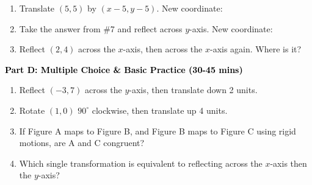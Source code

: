 \documentclass[12pt, letterpaper, fleqn]{article}
\newcommand{\blank}{\underline{\hspace{2.2cm}}}
\begin{document}
\vspace{3mm}

\begin{enumerate}[itemsep=2.5cm, leftmargin=0.6cm, resume]
\item Translate $(5, 5)$ by $(x-5, y-5)$. New coordinate: \blank
\item Take the answer from \#7 and reflect across $y$-axis. New coordinate: \blank
\item Reflect $(2, 4)$ across the $x$-axis, then across the $x$-axis again. Where is it? \blank
\end{enumerate}

\newpage

\begin{tcolorbox}[colback=customteal!20]
\large\textcolor{black}{\textbf{Part D: Multiple Choice \& Basic Practice (30-45 mins)}}
\end{tcolorbox}

\vspace{3mm}

\begin{enumerate}[itemsep=2.5cm, leftmargin=0.6cm, resume]
\item Reflect $(-3, 7)$ across the $y$-axis, then translate down 2 units. \blank
\item Rotate $(1, 0)$ $90^\circ$ clockwise, then translate up 4 units. \blank
\item If Figure A maps to Figure B, and Figure B maps to Figure C using rigid motions, are A and C congruent? \blank
\item Which single transformation is equivalent to reflecting across the $x$-axis then the $y$-axis? \blank
\end{enumerate}
\end{document}
